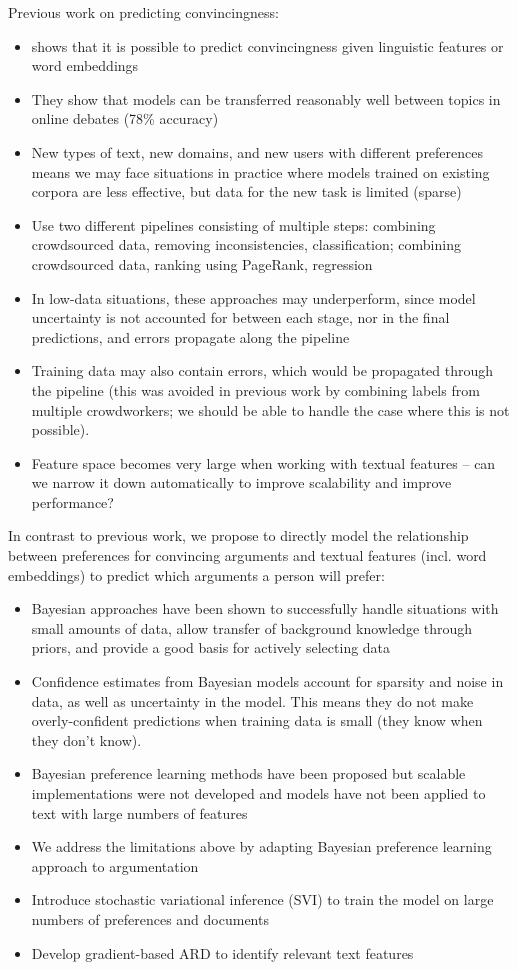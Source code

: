 Previous work on predicting convincingness:
\begin{itemize}
  \item \cite{habernal2016argument} shows that it is possible to predict convincingness given linguistic features or word embeddings
  \item They show that models can be transferred reasonably well between topics in online debates (78\% accuracy)
  \item New types of text, new domains, and new users with different preferences means we may face situations in practice where models trained on existing corpora are less effective, but data for the new task is limited (sparse)
  \item Use two different pipelines consisting of multiple steps: combining crowdsourced data, removing inconsistencies, classification; combining crowdsourced data, ranking using PageRank, regression
  \item In low-data situations, these approaches may underperform, since model uncertainty is not accounted for between each stage, nor in the final predictions, and errors propagate along the pipeline
  \item Training data may also contain errors, which would be propagated through the pipeline (this was avoided in previous work by combining labels from multiple crowdworkers; we should be able to handle the case where this is not possible).
  \item Feature space becomes very large when working with textual features -- can we narrow it down automatically to improve scalability and improve performance?
\end{itemize}

In contrast to previous work, we propose to directly model the relationship between preferences for convincing arguments and textual features (incl. word embeddings) to predict which arguments a person will prefer:
\begin{itemize}
  \item Bayesian approaches have been shown to successfully handle situations with small amounts of data, allow transfer of background knowledge through priors, and provide a good basis for actively selecting data
  \item Confidence estimates from Bayesian models account for sparsity and noise in data, as well as uncertainty in the model. This means they do not make overly-confident predictions when training data is small (they know when they don't know).
  \item Bayesian preference learning methods have been proposed but scalable implementations were not developed and models have not been applied to text with large numbers of features
  \item We address the limitations above by adapting Bayesian preference learning approach to argumentation
  \item Introduce stochastic variational inference (SVI) to train the model on large numbers of preferences and documents
  \item Develop gradient-based ARD to identify relevant text features
\end{itemize}

